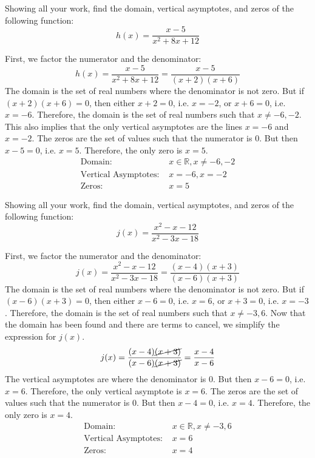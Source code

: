 \documentclass[11pt,letterpaper]{article}
\begin{document}
\newpage





 Showing all your work, find the domain, vertical asymptotes, and zeros of the following function:
	\[
	h(x)= \dfrac{x - 5}{x^2 + 8x + 12}
	\] \pspace

\sol First, we factor the numerator and the denominator:
	\[
	h(x)= \dfrac{x - 5}{x^2 + 8x + 12}= \dfrac{x - 5}{(x + 2)(x + 6)}
	\]
The domain is the set of real numbers where the denominator is not zero. But if $(x + 2)(x + 6)= 0$, then either $x + 2= 0$, i.e. $x= -2$, or $x + 6= 0$, i.e. $x= -6$. Therefore, the domain is the set of real numbers such that $x \neq -6, -2$. This also implies that the only vertical asymptotes are the lines $x= -6$ and $x= -2$. The zeros are the set of values such that the numerator is 0. But then $x - 5= 0$, i.e. $x= 5$. Therefore, the only zero is $x= 5$.  
	\[
	\boxed{
	\begin{aligned}
	\text{Domain: }& x \in \mathbb{R}, x \neq -6, -2 \\
	\text{Vertical Asymptotes: }& x= -6, x= -2 \\
	\text{Zeros: }& x= 5
	\end{aligned}
	}
	\]





\newpage





 Showing all your work, find the domain, vertical asymptotes, and zeros of the following function:
	\[
	j(x)= \dfrac{x^2 - x - 12}{x^2 - 3x - 18}
	\] \pspace

\sol First, we factor the numerator and the denominator:
	\[
	j(x)= \dfrac{x^2 - x - 12}{x^2 - 3x - 18}= \dfrac{(x - 4)(x + 3)}{(x - 6)(x + 3)}
	\]
The domain is the set of real numbers where the denominator is not zero. But if $(x - 6)(x + 3)= 0$, then either $x - 6= 0$, i.e. $x= 6$, or $x + 3= 0$, i.e. $x= -3$. Therefore, the domain is the set of real numbers such that $x \neq -3, 6$. Now that the domain has been found and there are terms to cancel, we simplify the expression for $j(x)$. 
	\[
	j(x)= \dfrac{(x - 4)\cancel{(x + 3)}}{(x - 6)\cancel{(x + 3)}}= \dfrac{x - 4}{x - 6}
	\]
The vertical asymptotes are where the denominator is 0. But then $x - 6= 0$, i.e. $x= 6$. Therefore, the only vertical asymptote is $x= 6$. The zeros are the set of values such that the numerator is 0. But then $x - 4= 0$, i.e. $x= 4$. Therefore, the only zero is $x= 4$.  
	\[
	\boxed{
	\begin{aligned}
	\text{Domain: }& x \in \mathbb{R}, x \neq -3, 6 \\
	\text{Vertical Asymptotes: }& x= 6 \\
	\text{Zeros: }& x= 4
	\end{aligned}
	}
	\]


\end{document}
